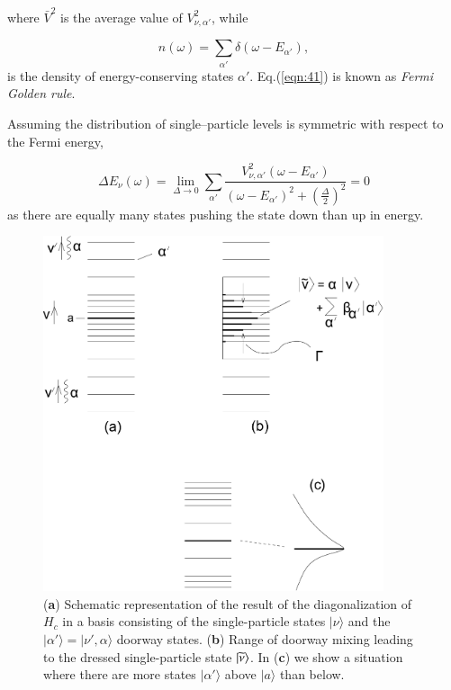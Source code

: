 \noindent where $\bar{V}^2$ is the average value of $V_{\nu ,\alpha'}^2$, while

\begin{equation}
n(\omega) = \sum_{\alpha'} \delta(\omega - E_{\alpha'}) ,
\label{eqn:42}
\end{equation}
is the density of energy-conserving states $\alpha'$. Eq.(\ref{eqn:41}) is known as {\it Fermi Golden rule}.

Assuming the distribution of single--particle levels is symmetric with respect to the Fermi energy,

\begin{equation}
\Delta E_\nu(\omega) = \lim_{\Delta \rightarrow 0} \sum_{\alpha'} \frac{V_{\nu,\alpha'}^2 (\omega - E_{\alpha'})}{(\omega - E_{\alpha'})^2 + \left( \frac{\Delta}{2} \right)^2} = 0
\end{equation}
as there are equally many states pushing the state down than up in energy. 

\begin{figure}
\centerline {
\includegraphics*[width=10cm]{introduccion/figs/figintroD5}
}
\caption{(\textbf{a}) Schematic representation of the result of the diagonalization of $H_{c}$ in a basis consisting of the single-particle states $|\nu \rangle$ and the $|\alpha' \rangle=|\nu', {\alpha} \rangle$ doorway states. (\textbf{b}) Range of doorway mixing leading to the dressed single-particle state $|{\widetilde\nu} \rangle$. In (\textbf{c}) we show a situation where there are more states $|\alpha' \rangle$ above $|a\rangle$ than below.}
\label{fig:4.5}
\end{figure}





